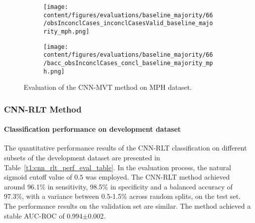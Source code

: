 \begin{figure}[ht]
  \begin{subfigure}{0.49\textwidth}
    \centering
    \texttt{[image: content/figures/evaluations/baseline\_majority/66/obsInconclCases\_inconclCasesValid\_baseline\_majority\_mph.png]}
    \label{fig:obsInconclCases_inconclCasesValid_baseline_majority_mph}
  \end{subfigure}
  \hfill
  \begin{subfigure}{0.49\textwidth}
    \centering
    \texttt{[image: content/figures/evaluations/baseline\_majority/66/bacc\_obsInconclCases\_concl\_baseline\_majority\_mph.png]}
    \label{fig:bacc_obsInconclCases_concl_baseline_majority_mph}
  \end{subfigure}
  \caption{Evaluation of the CNN-MVT method on MPH dataset.}
  \label{fig:perf_results_mvt_mph}
\end{figure}


\subsubsection{CNN-RLT Method}
\label{subsubsec:eval_rlt}


\paragraph{Classification performance on development dataset}

The quantitative performance results of the CNN-RLT classification on 
different subsets of the development dataset are presented in Table~\ref{t1:cnn_rlt_perf_eval_table}.
In the evaluation process, the natural sigmoid cutoff value of $0.5$ was employed.
The CNN-RLT method achieved around 96.1\% in sensitivity, 98.5\% in specificity and a balanced accuracy of 97.3\%, 
with a variance between 0.5-1.5\% across random splits, on the test set.
The performance results on the validation set are similar.
The method achieved a stable AUC-ROC of 0.994$\pm$0.002.


